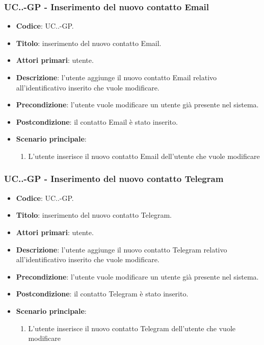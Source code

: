 			\subsubsection{UC\theuccount.\thesubuccount.\thesubsubuccount-GP - Inserimento del nuovo contatto Email}
				
				\begin{itemize}
					\item \textbf{Codice}: UC\theuccount.\thesubuccount.\thesubsubuccount-GP.
					\item \textbf{Titolo}: inserimento del nuovo contatto Email.
					\item \textbf{Attori primari}: utente.
					\item \textbf{Descrizione}: l'utente aggiunge il nuovo contatto Email relativo all'identificativo inserito che vuole modificare.
					\item \textbf{Precondizione}: l'utente vuole modificare un utente già presente nel sistema.
					\item \textbf{Postcondizione}: il contatto Email è stato inserito.
					\item \textbf{Scenario principale}:
					\begin{enumerate}
						\item L'utente inserisce il nuovo contatto Email dell'utente che vuole modificare
					\end{enumerate}
				\end{itemize}
			
			\subsubsection{UC\theuccount.\thesubuccount.\thesubsubuccount-GP - Inserimento del nuovo contatto Telegram}
				
				\begin{itemize}
					\item \textbf{Codice}: UC\theuccount.\thesubuccount.\thesubsubuccount-GP.
					\item \textbf{Titolo}: inserimento del nuovo contatto Telegram.
					\item \textbf{Attori primari}: utente.
					\item \textbf{Descrizione}: l'utente aggiunge il nuovo contatto Telegram relativo all'identificativo inserito che vuole modificare.
					\item \textbf{Precondizione}: l'utente vuole modificare un utente già presente nel sistema.
					\item \textbf{Postcondizione}: il contatto Telegram è stato inserito.
					\item \textbf{Scenario principale}:
					\begin{enumerate}
						\item L'utente inserisce il nuovo contatto Telegram dell'utente che vuole modificare
					\end{enumerate}
				\end{itemize}
			
